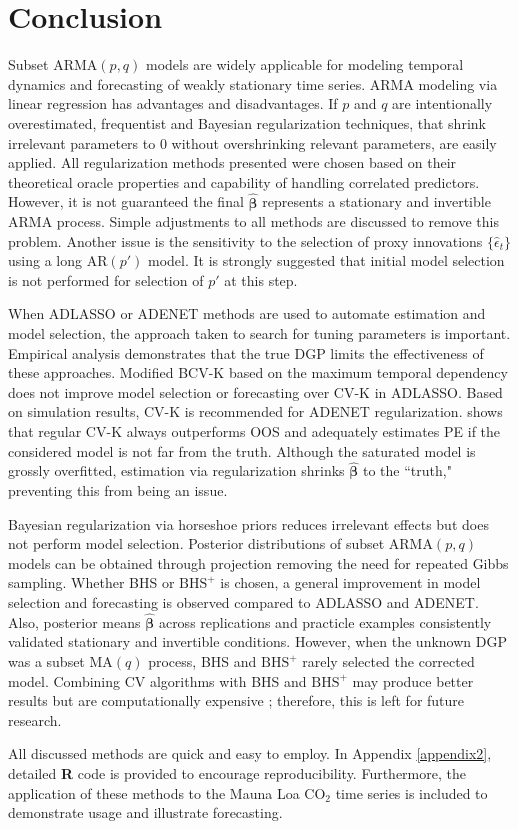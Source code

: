 \section{Conclusion}

Subset ARMA$(p,q)$ models are widely applicable for modeling temporal dynamics and forecasting of weakly stationary time series. ARMA modeling via linear regression has advantages and disadvantages. If $p$ and $q$ are intentionally overestimated, frequentist and Bayesian regularization techniques, that shrink irrelevant parameters to $0$ without overshrinking relevant parameters, are easily applied. All regularization methods presented were chosen based on their theoretical oracle properties and capability of handling correlated predictors. However, it is not guaranteed the final $\hat{\bm{\beta}}$ represents a stationary and invertible ARMA process. Simple adjustments to all methods are discussed to remove this problem. Another issue is the sensitivity to the selection of proxy innovations $\{\hat{\epsilon}_t\}$ using a long AR$(p')$ model. It is strongly suggested that initial model selection is not performed for selection of $p'$ at this step.

When ADLASSO or ADENET methods are used to automate estimation and model selection, the approach taken to search for tuning parameters is important. Empirical analysis demonstrates that the true DGP limits the effectiveness of these approaches. Modified BCV-K based on the maximum temporal dependency does not improve model selection or forecasting over CV-K in ADLASSO. Based on simulation results, CV-K is recommended for ADENET regularization. \cite{Bergmeir2018} shows that regular CV-K always outperforms OOS and adequately estimates PE if the considered model is not far from the truth. Although the saturated model is grossly overfitted, estimation via regularization shrinks $\hat{\bm{\beta}}$ to the ``truth," preventing this from being an issue. 

Bayesian regularization via horseshoe priors reduces irrelevant effects but does not perform model selection.  Posterior distributions of subset ARMA$(p,q)$ models can be obtained through projection removing the need for repeated Gibbs sampling. Whether BHS or $\textrm{BHS}^+$ is chosen, a general improvement in model selection and forecasting is observed compared to ADLASSO and ADENET. Also, posterior means $\hat{\bm{\beta}}$ across replications and practicle examples consistently validated stationary and invertible conditions.  However, when the unknown DGP was a subset MA$(q)$ process, BHS and $\textrm{BHS}^+$ rarely selected the corrected model. Combining CV algorithms with BHS and $\textrm{BHS}^+$ may produce better results but are computationally expensive \citep{Peltola2014}; therefore, this is left for future research.

All discussed methods are quick and easy to employ. In Appendix \ref{appendix2}, detailed {\bf R} code is provided to encourage reproducibility. Furthermore, the application of these methods to the Mauna Loa $\textrm{CO}_2$ time series is included to demonstrate usage and illustrate forecasting. 

